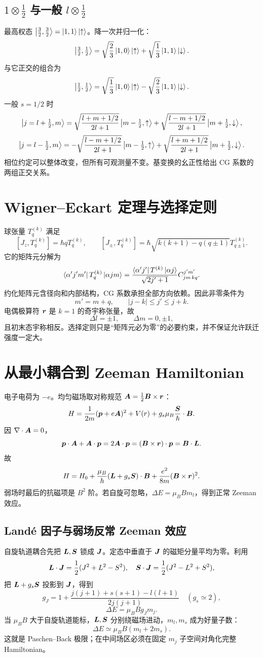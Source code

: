 \subsection{$1\otimes\tfrac12$ 与一般 $l\otimes\tfrac12$}
最高权态 $\left|\tfrac32,\tfrac32\right\rangle=\left|1,1\right\rangle\left|\uparrow\right\rangle$。降一次并归一化：
\[
\left|\tfrac32,\tfrac12\right\rangle
=\sqrt{\frac23}\left|1,0\right\rangle\left|\uparrow\right\rangle
+\sqrt{\frac13}\left|1,1\right\rangle\left|\downarrow\right\rangle.
\]
与它正交的组合为
\[
\left|\tfrac12,\tfrac12\right\rangle
=\sqrt{\frac13}\left|1,0\right\rangle\left|\uparrow\right\rangle
-\sqrt{\frac23}\left|1,1\right\rangle\left|\downarrow\right\rangle.
\]
一般 $s=1/2$ 时
\[
\left|j=l+\tfrac12,m\right\rangle
=\sqrt{\frac{l+m+1/2}{2l+1}}\left|m-\tfrac12,\uparrow\right\rangle
+\sqrt{\frac{l-m+1/2}{2l+1}}\left|m+\tfrac12,\downarrow\right\rangle,
\]
\[
\left|j=l-\tfrac12,m\right\rangle
=-\sqrt{\frac{l-m+1/2}{2l+1}}\left|m-\tfrac12,\uparrow\right\rangle
+\sqrt{\frac{l+m+1/2}{2l+1}}\left|m+\tfrac12,\downarrow\right\rangle.
\]
相位约定可以整体改变，但所有可观测量不变。基变换的幺正性给出 CG 系数的两组正交关系。

\section{Wigner--Eckart 定理与选择定则}
球张量 $T_q^{(k)}$ 满足
\[
[J_z,T_q^{(k)}]=\hbar qT_q^{(k)},\qquad
[J_\pm,T_q^{(k)}]
=\hbar\sqrt{k(k+1)-q(q\pm1)}T_{q\pm1}^{(k)}.
\]
它的矩阵元分解为
\[
\left\langle\alpha'j'm'\right|T_q^{(k)}\left|\alpha jm\right\rangle
=\frac{\left\langle\alpha'j'\right|T^{(k)}\left|\alpha j\right\rangle}
{\sqrt{2j'+1}}
C^{j'm'}_{jm\,kq}.
\]
约化矩阵元含径向和内部结构，CG 系数承担全部方向依赖。因此非零条件为
\[
m'=m+q,\qquad |j-k|\le j'\le j+k.
\]
电偶极算符 $\bm{r}$ 是 $k=1$ 的奇宇称张量，故
\[
\Delta l=\pm1,\qquad \Delta m=0,\pm1,
\]
且初末态宇称相反。选择定则只是“矩阵元必为零”的必要约束，并不保证允许跃迁强度一定大。

\section{从最小耦合到 Zeeman Hamiltonian}
电子电荷为 $-e$。均匀磁场取对称规范
$\bm{A}=\tfrac12\bm{B}\times\bm{r}$：
\[
H=\frac{1}{2m}(\bm{p}+e\bm{A})^2+V(r)+g_s\mu_B\frac{\bm{S}}{\hbar}\cdot\bm{B}.
\]
因 $\nabla\cdot\bm{A}=0$，
\[
\bm{p}\cdot\bm{A}+\bm{A}\cdot\bm{p}=2\bm{A}\cdot\bm{p}
=(\bm{B}\times\bm{r})\cdot\bm{p}=\bm{B}\cdot\bm{L}.
\]
故
\[
H=H_0+\frac{\mu_B}{\hbar}(\bm{L}+g_s\bm{S})\cdot\bm{B}
+\frac{e^2}{8m}(\bm{B}\times\bm{r})^2.
\]
弱场时最后的抗磁项是 $B^2$ 阶。若自旋可忽略，$\Delta E=\mu_BBm_l$，得到正常 Zeeman 效应。

\subsection{Landé 因子与弱场反常 Zeeman 效应}
自旋轨道耦合先把 $\bm{L},\bm{S}$ 锁成 $\bm{J}$。定态中垂直于 $\bm{J}$ 的磁矩分量平均为零。利用
\[
\bm{L}\cdot\bm{J}=\frac12(J^2+L^2-S^2),\quad
\bm{S}\cdot\bm{J}=\frac12(J^2-L^2+S^2),
\]
把 $\bm{L}+g_s\bm{S}$ 投影到 $\bm{J}$，得到
\[
g_J=1+\frac{j(j+1)+s(s+1)-l(l+1)}{2j(j+1)}
\quad(g_s\simeq2),
\]
\[
\boxed{\Delta E=\mu_BBg_Jm_j}.
\]
当 $\mu_BB$ 大于自旋轨道能标，$\bm{L},\bm{S}$ 分别绕磁场进动，$m_l,m_s$ 成为好量子数：
\[
\Delta E\simeq\mu_BB(m_l+2m_s).
\]
这就是 Paschen--Back 极限；在中间场区必须在固定 $m_j$ 子空间对角化完整 Hamiltonian。

